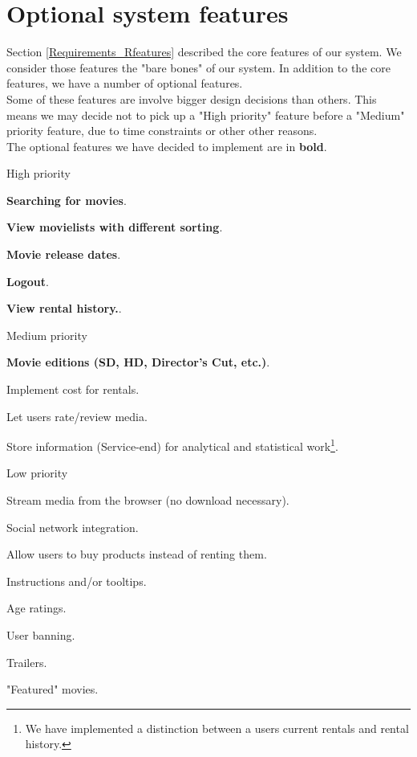 \section{Optional system features}
\label{Requirements_Ofeatures}
Section \ref{Requirements_Rfeatures} described the core features of our system. We consider those features the "bare bones" of our system. In addition to the core features, we have a number of optional features. 
\\Some of these features are involve bigger design decisions than others. This means we may decide not to pick up a "High priority" feature before a "Medium" priority feature, due to time constraints or other other reasons.
\\The optional features we have decided to implement are in \textbf{bold}.
\begin{my_itemize}
	\item High priority
	\begin{my_itemize}
		\item \textbf{Searching for movies}.
		\item \textbf{View movielists with different sorting}.
		\item \textbf{Movie release dates}.
		\item \textbf{Logout}.
		\item \textbf{View rental history.}.
	\end{my_itemize}
	\item Medium priority
	\begin{my_itemize}
		\item \textbf{Movie editions (SD, HD, Director's Cut, etc.)}.
		\item Implement cost for rentals.
		\item Let users rate/review media.
		\item Store information (Service-end) for analytical and statistical work\footnote{We have implemented a distinction between a users current rentals and rental history.}.
	\end{my_itemize}
	\item Low priority
	\begin{my_itemize}
		\item Stream media from the browser (no download necessary).
		\item Social network integration.
		\item Allow users to buy products instead of renting them.
		\item Instructions and/or tooltips.
 		\item Age ratings.
		\item User banning.
		\item Trailers.
		\item "Featured" movies.
	\end{my_itemize}
\end{my_itemize}


